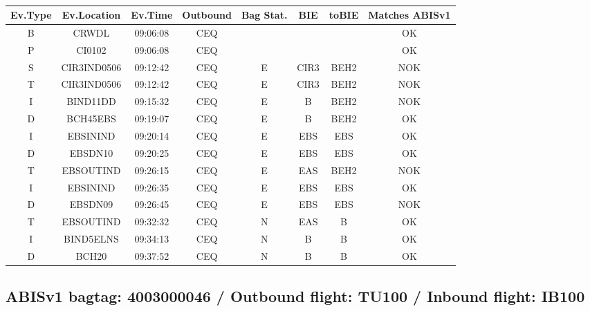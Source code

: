 \documentclass{report}
\begin{document}
\paragraph{}
\begin{longtable}{cccccccc}    \toprule
\rowcolor{white!50}
\textbf{Ev.Type} & \textbf{Ev.Location} & \textbf{Ev.Time} & \textbf{Outbound} & \textbf{Bag Stat.} & \textbf{BIE} & \textbf{toBIE} & \textbf{Matches ABISv1} \\\midrule
B & CRWDL & 09:06:08  & CEQ &  &  &  & OK\\
P & CI0102 & 09:06:08  & CEQ &  &  &  & OK\\
S & CIR3IND0506 & 09:12:42  & CEQ & E & CIR3 & BEH2 & NOK\\
T & CIR3IND0506 & 09:12:42  & CEQ & E & CIR3 & BEH2 & NOK\\
I & BIND11DD & 09:15:32  & CEQ & E & B & BEH2 & NOK\\
D & BCH45EBS & 09:19:07  & CEQ & E & B & BEH2 & OK\\
I & EBSININD & 09:20:14  & CEQ & E & EBS & EBS & OK\\
D & EBSDN10 & 09:20:25  & CEQ & E & EBS & EBS & OK\\
T & EBSOUTIND & 09:26:15  & CEQ & E & EAS & BEH2 & NOK\\
I & EBSININD & 09:26:35  & CEQ & E & EBS & EBS & OK\\
D & EBSDN09 & 09:26:45  & CEQ & E & EBS & EBS & NOK\\
T & EBSOUTIND & 09:32:32  & CEQ & N & EAS & B & OK\\
I & BIND5ELNS & 09:34:13  & CEQ & N & B & B & OK\\
D & BCH20 & 09:37:52  & CEQ & N & B & B & OK\\
\bottomrule
\end{longtable}
\subsection*{ABISv1 bagtag: 4003000046 / Outbound flight: TU100 / Inbound flight: IB100}
\end{document}
